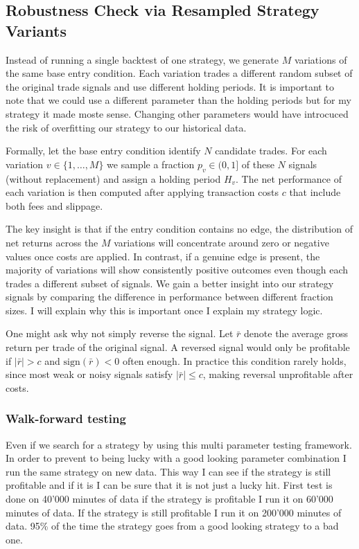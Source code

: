 \documentclass[12pt]{article}
\begin{document}
\newpage
\subsection{Robustness Check via Resampled Strategy Variants}

Instead of running a single backtest of one strategy, we generate $M$ variations of the same base entry condition. Each variation trades a different random subset of the original trade signals and use different holding periods. It is important to note that we could use a different parameter than the holding periods but for my strategy it made moste sense. Changing other parameters would have introcuced the risk of overfitting our strategy to our historical data.

Formally, let the base entry condition identify $N$ candidate trades. For each variation $v \in \{1,\dots,M\}$ we sample a fraction $p_v \in (0,1]$ of these $N$ signals (without replacement) and assign a holding period $H_v$. The net performance of each variation is then computed after applying transaction costs $c$ that include both fees and slippage.

The key insight is that if the entry condition contains no edge, the distribution of net returns across the $M$ variations will concentrate around zero or negative values once costs are applied. In contrast, if a genuine edge is present, the majority of variations will show consistently positive outcomes even though each trades a different subset of signals. We gain a better insight into our strategy signals by comparing the difference in performance between different fraction sizes. I will explain why this is important once I explain my strategy logic.

One might ask why not simply reverse the signal. Let $\bar{r}$ denote the average gross return per trade of the original signal. A reversed signal would only be profitable if $|\bar{r}| > c$ and $\mathrm{sign}(\bar{r}) < 0$ often enough. In practice this condition rarely holds, since most weak or noisy signals satisfy $|\bar{r}| \leq c$, making reversal unprofitable after costs.


\subsubsection*{Walk-forward testing}
Even if we search for a strategy by using this multi parameter testing framework. In order to prevent to being lucky with a good looking parameter combination I run the same strategy on new data. This way I can see if the strategy is still profitable and if it is I can be sure that it is not just a lucky hit.
First test is done on 40'000 minutes of data if the strategy is profitable I run it on 60'000 minutes of data. If the strategy is still profitable I run it on 200'000 minutes of data. 95\% of the time the strategy goes from a good looking strategy to a bad one.
\end{document}
